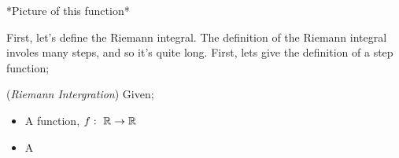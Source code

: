 *Picture of this function*

First, let's define the Riemann integral. The definition of the Riemann integral involes many steps, and so it's quite long.
First, lets give the definition of a step function;
\begin{definition}{{(\em Riemann Intergration\/})}
	Given;
	\begin{itemize}
		\item A function, $f: \ \mathbb{R} \rightarrow \mathbb{R}$
		\item A
	\end{itemize}
\end{definition}
	



